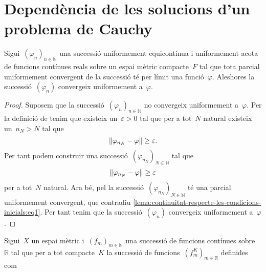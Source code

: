 \documentclass[../../main.tex]{subfiles}
\begin{document}
\section{Dependència de les solucions d'un problema de Cauchy}
    \begin{lemma}
        \label{lema:continuitat-respecte-les-condicions-inicials}
        Sigui~\((\varphi_{n})_{n\in\mathbb{N}}\) una successió uniformement equicontínua i uniformement acota de funcions contínues reals sobre un espai mètric compacte~\(F\) tal que tota parcial uniformement convergent de la successió té per límit una funció~\(\varphi\).
        Aleshores la successió~\((\varphi_{n})\) convergeix uniformement a~\(\varphi\).
    \end{lemma}
    \begin{proof}
        Suposem que la successió~\((\varphi_{n})_{n\in\mathbb{N}}\) no convergeix uniformement a~\(\varphi\).
        Per la definició de  tenim que existeix un~\(\varepsilon>0\) tal que per a tot~\(N\) natural existeix un~\(n_{N}>N\) tal que
        \[
            \norm{\varphi_{n_{N}}-\varphi}\geq\varepsilon.
        \]
        Per tant podem construir una successió~\((\varphi_{n_{N}})_{N\in\mathbb{N}}\) tal que
        \begin{equation}
            \label{lema:continuitat-respecte-les-condicions-inicials:eq1}
            \norm{\varphi_{n_{N}}-\varphi}\geq\varepsilon
        \end{equation}
        per a tot~\(N\) natural.
        Ara bé, pel  la successió~\((\varphi_{n_{N}})_{N\in\mathbb{N}}\) té una parcial uniformement convergent, que contradiu \eqref{lema:continuitat-respecte-les-condicions-inicials:eq1}.
        Per tant tenim que la successió~\((\varphi_{n})\) convergeix uniformement a~\(\varphi\).
    \end{proof}
    \begin{definition}
        \label{def:convergencia-uniforme-sobre-compactes}
        Sigui~\(X\) un espai mètric i~\((f_{m})_{m\in\mathbb{N}}\) una successió de funcions contínues sobre~\(\mathbb{R}\) tal que per a tot compacte~\(K\) la successió de funcions~\((f_{m}^{K})_{m\in\mathbb{R}}\) definides com

    \end{definition}
\end{document}
